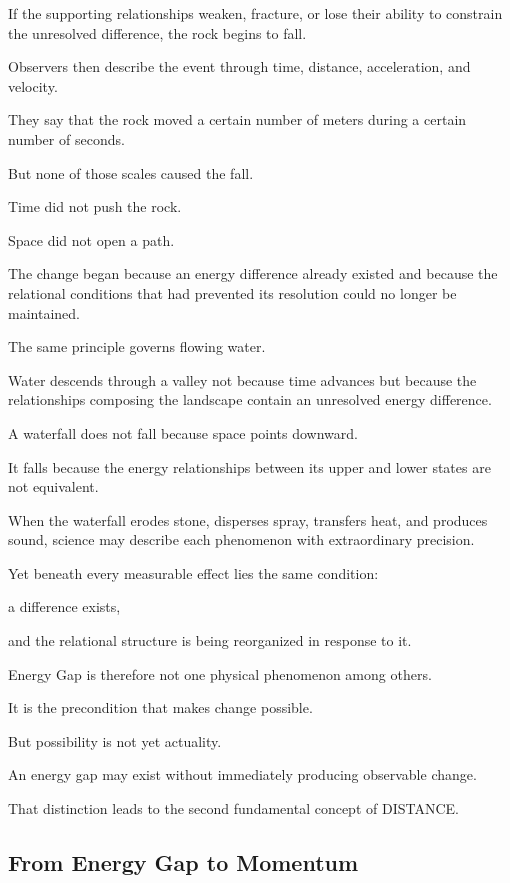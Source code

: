 If the supporting relationships weaken, fracture, or lose their ability to constrain the unresolved difference, the rock begins to fall.

Observers then describe the event through time, distance, acceleration, and velocity.

They say that the rock moved a certain number of meters during a certain number of seconds.

But none of those scales caused the fall.

Time did not push the rock.

Space did not open a path.

The change began because an energy difference already existed and because the relational conditions that had prevented its resolution could no longer be maintained.

The same principle governs flowing water.

Water descends through a valley not because time advances but because the relationships composing the landscape contain an unresolved energy difference.

A waterfall does not fall because space points downward.

It falls because the energy relationships between its upper and lower states are not equivalent.

When the waterfall erodes stone, disperses spray, transfers heat, and produces sound, science may describe each phenomenon with extraordinary precision.

Yet beneath every measurable effect lies the same condition:

a difference exists,

and the relational structure is being reorganized in response to it.

Energy Gap is therefore not one physical phenomenon among others.

It is the precondition that makes change possible.

But possibility is not yet actuality.

An energy gap may exist without immediately producing observable change.

That distinction leads to the second fundamental concept of DISTANCE.

\subsection*{\textbf{From Energy Gap to Momentum}}

